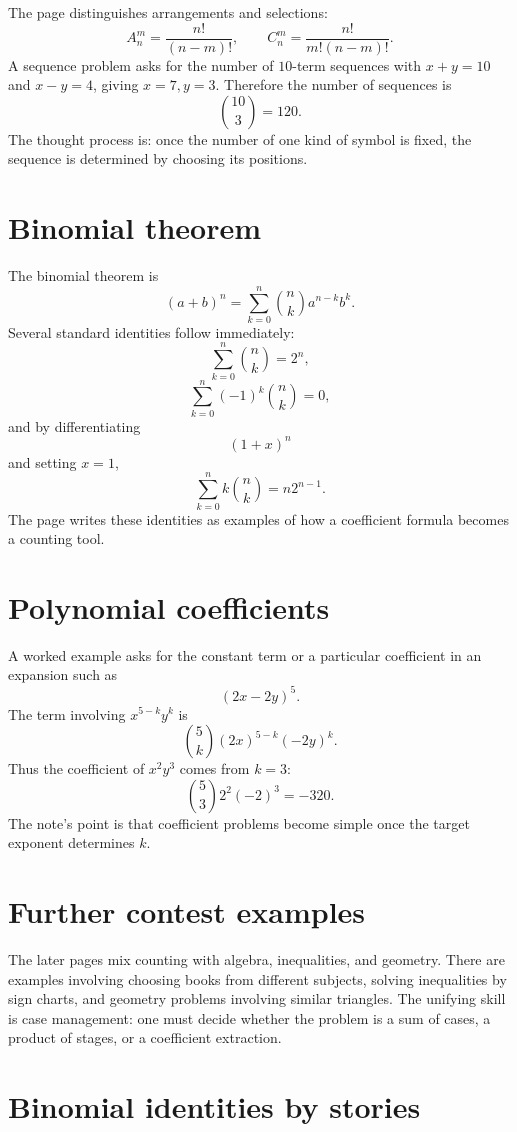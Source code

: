 The page distinguishes arrangements and selections:
\[
  A_n^m=\frac{n!}{(n-m)!},\qquad
  C_n^m=\frac{n!}{m!(n-m)!}.
\]
A sequence problem asks for the number of \(10\)-term sequences with \(x+y=10\) and \(x-y=4\), giving \(x=7,y=3\).  Therefore the number of sequences is
\[
  \binom{10}{3}=120.
\]
The thought process is: once the number of one kind of symbol is fixed, the sequence is determined by choosing its positions.

\section{Binomial theorem}

The binomial theorem is
\[
  (a+b)^n=\sum_{k=0}^n\binom nk a^{n-k}b^k.
\]
Several standard identities follow immediately:
\[
  \sum_{k=0}^n\binom nk=2^n,
\]
\[
  \sum_{k=0}^n(-1)^k\binom nk=0,
\]
and by differentiating
\[
  (1+x)^n
\]
and setting \(x=1\),
\[
  \sum_{k=0}^n k\binom nk=n2^{n-1}.
\]
The page writes these identities as examples of how a coefficient formula becomes a counting tool.

\section{Polynomial coefficients}

A worked example asks for the constant term or a particular coefficient in an expansion such as
\[
  (2x-2y)^5.
\]
The term involving \(x^{5-k}y^k\) is
\[
  \binom5k(2x)^{5-k}(-2y)^k.
\]
Thus the coefficient of \(x^2y^3\) comes from \(k=3\):
\[
  \binom53 2^2(-2)^3=-320.
\]
The note's point is that coefficient problems become simple once the target exponent determines \(k\).

\section{Further contest examples}

The later pages mix counting with algebra, inequalities, and geometry.  There are examples involving choosing books from different subjects, solving inequalities by sign charts, and geometry problems involving similar triangles.  The unifying skill is case management: one must decide whether the problem is a sum of cases, a product of stages, or a coefficient extraction.


\section{Binomial identities by stories}

